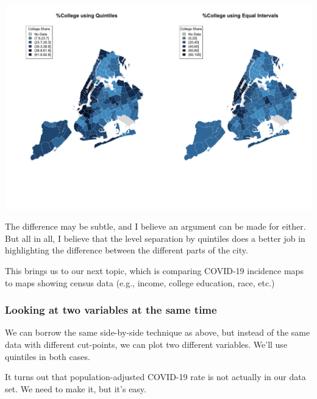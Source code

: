 \documentclass[
  openany]{book}
\newenvironment{Shaded}{\begin{snugshade}}{\end{snugshade}}
\newcommand{\AttributeTok}[1]{\textcolor[rgb]{0.77,0.63,0.00}{#1}}
\newcommand{\DecValTok}[1]{\textcolor[rgb]{0.00,0.00,0.81}{#1}}
\newcommand{\FunctionTok}[1]{\textcolor[rgb]{0.00,0.00,0.00}{#1}}
\newcommand{\NormalTok}[1]{#1}
\newcommand{\OtherTok}[1]{\textcolor[rgb]{0.56,0.35,0.01}{#1}}
\newcommand{\SpecialCharTok}[1]{\textcolor[rgb]{0.00,0.00,0.00}{#1}}
\newcommand{\StringTok}[1]{\textcolor[rgb]{0.31,0.60,0.02}{#1}}
\begin{document}
\begin{center}\includegraphics[width=0.9\linewidth]{carpedatum_files/figure-html/unnamed-chunk-93-1} \end{center}

The difference may be subtle, and I believe an argument can be made for either. But all in all, I believe that the level separation by quintiles does a better job in highlighting the difference between the different parts of the city.

This brings us to our next topic, which is comparing COVID-19 incidence maps to maps showing census data (e.g., income, college education, race, etc.)

\hypertarget{looking-at-two-variables-at-the-same-time}{%
\subsubsection*{Looking at two variables at the same time}\label{looking-at-two-variables-at-the-same-time}}

We can borrow the same side-by-side technique as above, but instead of the same data with different cut-points, we can plot two different variables. We'll use quintiles in both cases.

It turns out that population-adjusted COVID-19 rate is not actually in our data set. We need to make it, but it's easy.

\begin{Shaded}
\end{Shaded}
\end{document}
